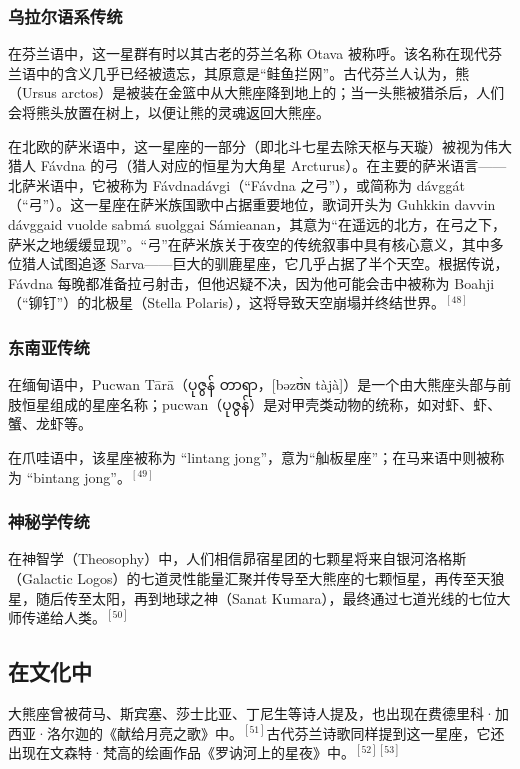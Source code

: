 \subsubsection{乌拉尔语系传统}  
在芬兰语中，这一星群有时以其古老的芬兰名称 Otava 被称呼。该名称在现代芬兰语中的含义几乎已经被遗忘，其原意是“鲑鱼拦网”。古代芬兰人认为，熊（Ursus arctos）是被装在金篮中从大熊座降到地上的；当一头熊被猎杀后，人们会将熊头放置在树上，以便让熊的灵魂返回大熊座。

在北欧的萨米语中，这一星座的一部分（即北斗七星去除天枢与天璇）被视为伟大猎人 Fávdna 的弓（猎人对应的恒星为大角星 Arcturus）。在主要的萨米语言——北萨米语中，它被称为 Fávdnadávgi（“Fávdna 之弓”），或简称为 dávggát（“弓”）。这一星座在萨米族国歌中占据重要地位，歌词开头为 Guhkkin davvin dávggaid vuolde sabmá suolggai Sámieanan，其意为“在遥远的北方，在弓之下，萨米之地缓缓显现”。“弓”在萨米族关于夜空的传统叙事中具有核心意义，其中多位猎人试图追逐 Sarva——巨大的驯鹿星座，它几乎占据了半个天空。根据传说，Fávdna 每晚都准备拉弓射击，但他迟疑不决，因为他可能会击中被称为 Boahji（“铆钉”）的北极星（Stella Polaris），这将导致天空崩塌并终结世界。$^{[48]}$
\subsubsection{东南亚传统}  
在缅甸语中，Pucwan Tārā（ပုဇွန် တာရာ，[bəzʊ̀ɴ tàjà]）是一个由大熊座头部与前肢恒星组成的星座名称；pucwan（ပုဇွန်）是对甲壳类动物的统称，如对虾、虾、蟹、龙虾等。

在爪哇语中，该星座被称为 “lintang jong”，意为“舢板星座”；在马来语中则被称为 “bintang jong”。$^{[49]}$
\subsubsection{神秘学传统}  
在神智学（Theosophy）中，人们相信昴宿星团的七颗星将来自银河洛格斯（Galactic Logos）的七道灵性能量汇聚并传导至大熊座的七颗恒星，再传至天狼星，随后传至太阳，再到地球之神（Sanat Kumara），最终通过七道光线的七位大师传递给人类。$^{[50]}$
\subsection{在文化中}  
大熊座曾被荷马、斯宾塞、莎士比亚、丁尼生等诗人提及，也出现在费德里科·加西亚·洛尔迦的《献给月亮之歌》中。$^{[51]}$古代芬兰诗歌同样提到这一星座，它还出现在文森特·梵高的绘画作品《罗讷河上的星夜》中。$^{[52][53]}$
